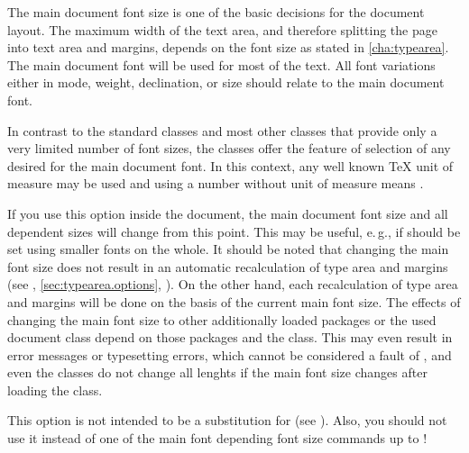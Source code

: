 The main document font size is one of the basic decisions for the document
layout. The maximum width of the text area, and therefore splitting the page
into text area and margins, depends on the font size as stated in
\autoref{cha:typearea}. The main document font will be used for most 
of the text. All font variations either in mode, weight, declination, or size
should relate to the main document font.


\begin{Declaration}
\end{Declaration}
In contrast to the standard classes and most other classes that provide only
a very limited number of font sizes, the \KOMAScript{} classes offer the
feature of selection of any desired  for the main document
font. In this context, any well known \TeX{} unit of measure may be used and
using a number without unit of measure means .

If you use this option inside the document, the main document font size and
all dependent sizes will change from this point. This may be useful, e.\,g.,
if %
%
%
should be set using smaller fonts on the whole. It should be noted that
changing the main font size does not result in an automatic recalculation of
type area and margins (see ,
\autoref{sec:typearea.options},
). On the other hand, each
recalculation of type area and margins will be done on the basis of the
current main font size. The effects of changing the main font size to other
additionally loaded packages or the used document class depend on those
packages and the class. This may even result in error messages or typesetting
errors, which cannot be considered a fault of \KOMAScript, and even the
\KOMAScript{} classes do not change all lenghts if the main font size
changes after loading the class.

This option is not intended to be a substitution for
 (see \cite{latex:fntguide}). Also, you should not use it
instead of one of the main font depending font size commands  up
to !%

\fi  %



